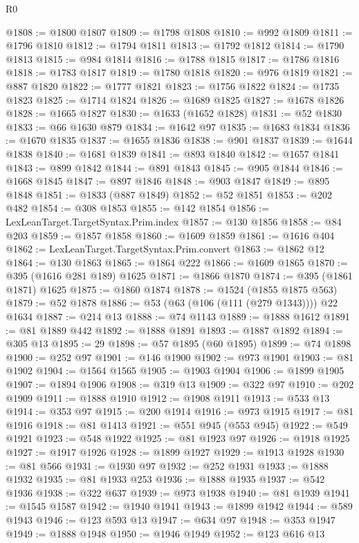 \begin{lexlean}{R0}
\begin{coremodule}
@1808 := @1800 @1807
@1809 := @1798 @1808
@1810 := @992 @1809
@1811 := @1796 @1810
@1812 := @1794 @1811
@1813 := @1792 @1812
@1814 := @1790 @1813
@1815 := @984 @1814
@1816 := @1788 @1815
@1817 := @1786 @1816
@1818 := @1783 @1817
@1819 := @1780 @1818
@1820 := @976 @1819
@1821 := @887 @1820
@1822 := @1777 @1821
@1823 := @1756 @1822
@1824 := @1735 @1823
@1825 := @1714 @1824
@1826 := @1689 @1825
@1827 := @1678 @1826
@1828 := @1665 @1827
@1830 := @1633 (@1652 @1828)
@1831 := @52 @1830
@1833 := @66 @1630 @879
@1834 := @1642 @97
@1835 := @1683 @1834
@1836 := @1670 @1835
@1837 := @1655 @1836
@1838 := @901 @1837
@1839 := @1644 @1838
@1840 := @1681 @1839
@1841 := @893 @1840
@1842 := @1657 @1841
@1843 := @899 @1842
@1844 := @891 @1843
@1845 := @905 @1844
@1846 := @1668 @1845
@1847 := @897 @1846
@1848 := @903 @1847
@1849 := @895 @1848
@1851 := @1833 (@887 @1849)
@1852 := @52 @1851
@1853 := @202 @482
@1854 := @308 @1853
@1855 := @142 @1854
@1856 := LexLeanTarget.TargetSyntax.Prim.index
@1857 := @130 @1856
@1858 := @84 @203
@1859 := @1857 @1858
@1860 := @1609 @1859
@1861 := @1616 @404
@1862 := LexLeanTarget.TargetSyntax.Prim.convert
@1863 := @1862 @12
@1864 := @130 @1863
@1865 := @1864 @222
@1866 := @1609 @1865
@1870 := @395 (@1616 @281 @189) @1625
@1871 := @1866 @1870
@1874 := @395 (@1861 @1871) @1625
@1875 := @1860 @1874
@1878 := @1524 (@1855 @1875 @563)
@1879 := @52 @1878
@1886 := @53 (@63 (@106 (@111 (@279 @1343)))) @22 @1634
@1887 := @214 @13
@1888 := @74 @1143
@1889 := @1888 @1612
@1891 := @81 @1889 @442
@1892 := @1888 @1891
@1893 := @1887 @1892
@1894 := @305 @13
@1895 := 29
@1898 := @57 @1895 (@60 @1895)
@1899 := @74 @1898
@1900 := @252 @97
@1901 := @146 @1900
@1902 := @973 @1901
@1903 := @81 @1902
@1904 := @1564 @1565
@1905 := @1903 @1904
@1906 := @1899 @1905
@1907 := @1894 @1906
@1908 := @319 @13
@1909 := @322 @97
@1910 := @202 @1909
@1911 := @1888 @1910
@1912 := @1908 @1911
@1913 := @533 @13
@1914 := @353 @97
@1915 := @200 @1914
@1916 := @973 @1915
@1917 := @81 @1916
@1918 := @81 @1413
@1921 := @551 @945 (@553 @945)
@1922 := @549 @1921
@1923 := @548 @1922
@1925 := @81 @1923 @97
@1926 := @1918 @1925
@1927 := @1917 @1926
@1928 := @1899 @1927
@1929 := @1913 @1928
@1930 := @81 @566
@1931 := @1930 @97
@1932 := @252 @1931
@1933 := @1888 @1932
@1935 := @81 @1933 @253
@1936 := @1888 @1935
@1937 := @542 @1936
@1938 := @322 @637
@1939 := @973 @1938
@1940 := @81 @1939
@1941 := @1545 @1587
@1942 := @1940 @1941
@1943 := @1899 @1942
@1944 := @589 @1943
@1946 := @123 @593 @13
@1947 := @634 @97
@1948 := @353 @1947
@1949 := @1888 @1948
@1950 := @1946 @1949
@1952 := @123 @616 @13

\end{coremodule}
\end{lexlean}
